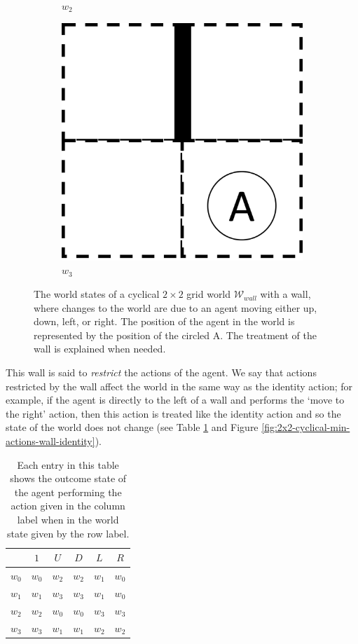 \begin{figure}[H]
\begin{subfigure}[b]{0.45\linewidth}
        \caption{$w_{2}$}
    \end{subfigure}
    \begin{subfigure}[b]{0.45\linewidth}
        \centering
        \includegraphics[width=0.5\linewidth]{5BeyondSBDRL/Old/Images/2x2_with_wall_world_states/w3.png}
        \caption{$w_{3}$}
    \end{subfigure}
  \caption{
  The world states of a cyclical $2\times 2$ grid world $\mathscr{W}_{wall}$ with a wall, where changes to the world are due to an agent moving either up, down, left, or right.
  The position of the agent in the world is represented by the position of the circled A.
  The treatment of the wall is explained when needed.
  }
  \label{fig:2x2-cyclical-grid-world-wall-states}
\end{figure}

This wall is said to \textit{restrict} the actions of the agent.
We say that actions restricted by the wall affect the world in the same way as the identity action; for example, if the agent is directly to the left of a wall and performs the `move to the right' action, then this action is treated like the identity action and so the state of the world does not change (see Table \ref{tab:2x2-gridworld-minimum-transitions-wall-identity} and Figure \ref{fig:2x2-cyclical-min-actions-wall-identity}).

\begin{table}[H]
    \centering
    \begin{tabular}{c|c c c c c}
                &  $1$      & $U$       & $D$       & $L$               & $R$\\
         \hline
        $w_{0}$ & $w_{0}$   & $w_{2}$   & $w_{2}$   & $w_{1}$           & \textbf{$w_{0}$}\\
        $w_{1}$ & $w_{1}$   & $w_{3}$   & $w_{3}$   & \textbf{$w_{1}$}  & $w_{0}$\\
        $w_{2}$ & $w_{2}$   & $w_{0}$   & $w_{0}$   & $w_{3}$           & $w_{3}$\\
        $w_{3}$ & $w_{3}$   & $w_{1}$   & $w_{1}$   & $w_{2}$           & $w_{2}$\\
    \end{tabular}
    \caption{
    Each entry in this table shows the outcome state of the agent performing the action given in the column label when in the world state given by the row label.
    }
    \label{tab:2x2-gridworld-minimum-transitions-wall-identity}
\end{table}

